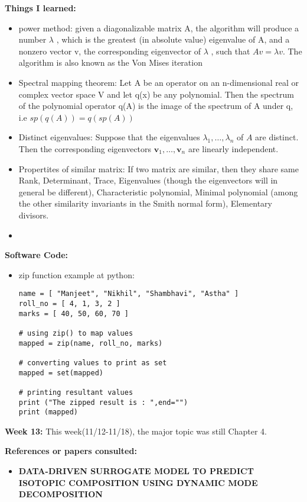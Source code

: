 \documentclass{article}
\begin{document}
\textbf{Things I learned:}
\begin{itemize}
\item power method: given a diagonalizable matrix A, the algorithm will produce a number $\lambda$ , which is the greatest (in absolute value) eigenvalue of A, and a nonzero vector  v, the corresponding eigenvector of $\lambda$ , such that $Av=\lambda v$. The algorithm is also known as the Von Mises iteration
\item Spectral mapping theorem: Let A be an operator on an n-dimensional real or complex vector space V and let q(x) be any polynomial. Then the spectrum of the polynomial operator q(A) is the image of the spectrum of A
under q, i.e $sp(q(A)) = q(sp(A))$
\item Distinct eigenvalues: Suppose that the eigenvalues  $ \lambda_1,\ldots,\lambda_n$ of $ A$ are distinct. Then the corresponding eigenvectors $ \mathbf{v}_1,\ldots,\mathbf{v}_n$ are linearly independent. 
\item Propertites of similar matrix: If two matrix are similar, then they share same Rank, Determinant, Trace, Eigenvalues (though the eigenvectors will in general be different), Characteristic polynomial, Minimal polynomial (among the other similarity invariants in the Smith normal form), Elementary divisors.
\item 
\end{itemize}

\textbf{Software Code:}
\begin{itemize}
\item zip function example at python:
\begin{verbatim}
name = [ "Manjeet", "Nikhil", "Shambhavi", "Astha" ] 
roll_no = [ 4, 1, 3, 2 ] 
marks = [ 40, 50, 60, 70 ] 
  
# using zip() to map values 
mapped = zip(name, roll_no, marks) 
  
# converting values to print as set 
mapped = set(mapped) 
  
# printing resultant values  
print ("The zipped result is : ",end="") 
print (mapped) 
\end{verbatim}

\end{itemize}


\newpage
\textbf{Week 13:}
This week(11/12-11/18), the major topic was still Chapter 4. 

\textbf{References or papers consulted:}
\begin{itemize}

\item \textbf{DATA-DRIVEN SURROGATE MODEL TO PREDICT ISOTOPIC COMPOSITION USING DYNAMIC MODE DECOMPOSITION}

\end{itemize}
\end{document}
